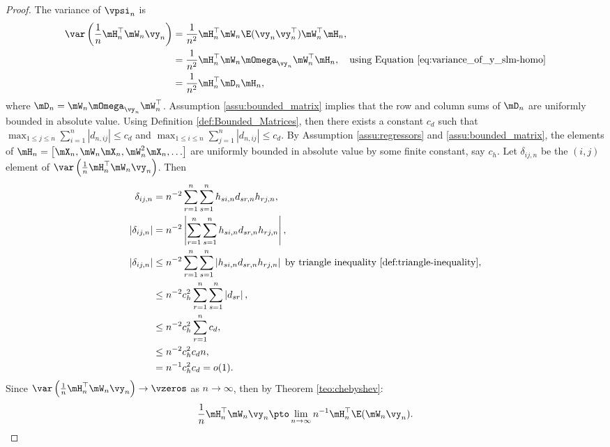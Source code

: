 \begin{proof}
The variance of $\vpsi_n$ is 
\begin{equation*}
\begin{aligned}
\var\left(\frac{1}{n}\mH_n^\top\mW_n\vy_n\right) & = \frac{1}{n^2}\mH_n^\top\mW_n\E(\vy_n\vy_n^\top)\mW_n^\top\mH_n, \\
& = \frac{1}{n^2}\mH_n^\top\mW_n\mOmega_{\vy_n}\mW_n^\top\mH_n, \quad \mbox{using Equation \eqref{eq:variance_of_y_slm-homo}} \\
& = \frac{1}{n^2}\mH_n^\top\mD_n\mH_n,
\end{aligned}
\end{equation*}
%
where $\mD_n = \mW_n\mOmega_{\vy_n}\mW_n^\top$. 
Assumption \ref{assu:bounded_matrix} implies that the row and column sums of $\mD_n$ are uniformly bounded in absolute value. Using Definition \ref{def:Bounded_Matrices}, then there exists a constant $c_d$ such that $\max_{1 \leq j\leq n}\sum_{i = 1}^n\left|d_{n, ij}\right| \leq c_d$ and $\max_{1 \leq i\leq n}\sum_{j = 1}^n\left|d_{n, ij}\right| \leq c_d$. By Assumption \ref{assu:regressors} and \ref{assu:bounded_matrix}, the elements of $\mH_n = \left[\mX_n, \mW_n\mX_n, \mW_n^2\mX_n, \ldots \right]$ are uniformly bounded in absolute value by some finite constant, say $c_h$. Let $\delta_{ij,n}$ be the $(i,j)$ element of $\var\left(\frac{1}{n}\mH_n^\top\mW_n\vy_n\right)$. Then
  \begin{equation*}
    \begin{aligned}
      \delta_{ij,n} & = n^{-2}\sum_{r = 1}^n\sum_{s = 1}^n h_{si,n}d_{sr,n}h_{rj,n}, \\
      \left|\delta_{ij, n}\right| & = n^{-2}\left|\sum_{r = 1}^n\sum_{s = 1}^n h_{si,n}d_{sr,n}h_{rj,n}\right|, \\
      \left|\delta_{ij, n}\right| & \leq n^{-2}\sum_{r = 1}^n\sum_{s = 1}^n \left|h_{si,n}d_{sr,n}h_{rj,n}\right| \; \mbox{by triangle inequality \ref{def:triangle-inequality}}, \\
       & \leq n^{-2}c_h^2\sum_{r = 1}^n\sum_{s = 1}^n  \left|d_{sr}\right|, \\
        & \leq n^{-2}c_h^2\sum_{r = 1}^n c_d, \\
        & \leq n^{-2}c_h^2c_dn, \\
        & = n^{-1}c_h^2c_d = o(1).
    \end{aligned}
  \end{equation*}
Since $\var\left(\frac{1}{n}\mH_n^\top\mW_n\vy_n\right)\to \vzeros$ as $n\to\infty$, then by Theorem \ref{teo:chebyshev}:
\begin{equation*}
\frac{1}{n}\mH_n^\top\mW_n\vy_n\pto \lim_{n\to\infty}n^{-1}\mH_n^\top\E(\mW_n\vy_n).
\end{equation*}
\end{proof}

